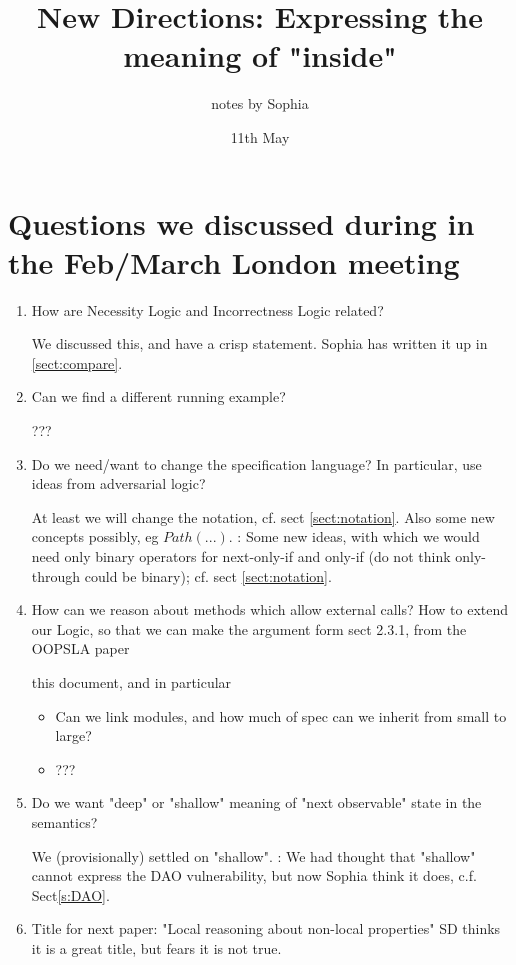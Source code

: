 \documentclass[11pt]{article} %
\title{New Directions: Expressing the meaning of "inside"}
\date{11th May}
\author{notes by Sophia}
\theoremstyle{definition}
\begin{document}
\maketitle

\section{Questions we discussed during in the Feb/March London meeting}

\begin{enumerate}
\item
How are Necessity Logic and Incorrectness Logic related?

We discussed this, and have a crisp statement. Sophia has written it up in \ref{sect:compare}.

\item
Can we find a different running example?

??? 
\item
Do we need/want to change  the specification language? In particular, use ideas from adversarial logic?

At least we will change the notation, cf. sect \ref{sect:notation}. Also some new concepts possibly, eg $Path(...)$.
\SP: Some new ideas, with which we would   need only binary operators for next-only-if and only-if (do not think only-through could be binary); cf. sect \ref{sect:notation}. 

\item
How can we reason about methods which allow external calls? 
How to extend our Logic, so that we can make the argument form sect 2.3.1, from the OOPSLA paper


this document, and in particular

\begin{itemize}
\item
Can we link  modules, and how much of spec can we inherit  from small to large?
\item 
???
\end{itemize}

\item
Do we want "deep" or "shallow" meaning of "next observable" state in the semantics?

We (provisionally) settled on "shallow". \SP: We had thought that "shallow" cannot express the DAO vulnerability, but now Sophia think it does, c.f. Sect\ref{s:DAO}.

\item
Title for next paper: "Local reasoning about non-local properties" SD thinks it is a great title, but fears it is not true.


\end{enumerate}
\end{document}
